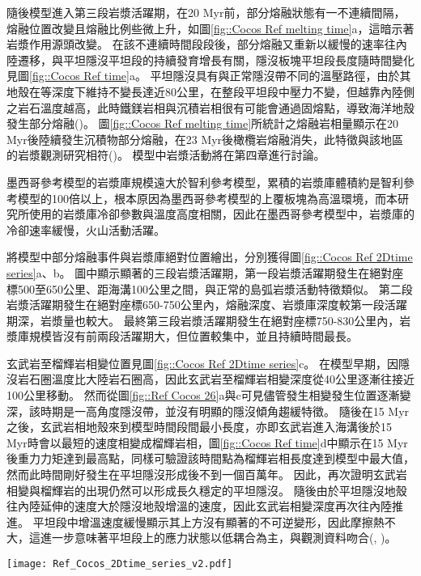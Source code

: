 隨後模型進入第三段岩漿活躍期，在20 Myr前，部分熔融狀態有一不連續間隔，熔融位置改變且熔融比例些微上升，如圖\ref{fig::Cocos Ref melting time}a，這暗示著岩漿作用源頭改變。
在該不連續時間段段後，部分熔融又重新以緩慢的速率往內陸遷移，與平坦隱沒平坦段的持續發育增長有關，隱沒板塊平坦段長度隨時間變化見圖\ref{fig::Cocos Ref time}a。
平坦隱沒具有與正常隱沒帶不同的溫壓路徑，由於其地殼在等深度下維持不變長達近80公里，在整段平坦段中壓力不變，但越靠內陸側之岩石溫度越高，此時鐵鎂岩相與沉積岩相很有可能會通過固熔點，導致海洋地殼發生部分熔融(\citealp{Gutscher2000Bcan})。
圖\ref{fig::Cocos Ref melting time}所統計之熔融岩相量顯示在20 Myr後陸續發生沉積物部分熔融，在23 Myr後橄欖岩熔融消失，此特徵與該地區的岩漿觀測研究相符(\citealp{ferrari2012dynamic})。
模型中岩漿活動將在第四章進行討論。

墨西哥參考模型的岩漿庫規模遠大於智利參考模型，累積的岩漿庫體積約是智利參考模型的100倍以上，根本原因為墨西哥參考模型的上覆板塊為高溫環境，而本研究所使用的岩漿庫冷卻參數與溫度高度相關，因此在墨西哥參考模型中，岩漿庫的冷卻速率緩慢，火山活動活躍。

將模型中部分熔融事件與岩漿庫絕對位置繪出，分別獲得圖\ref{fig::Cocos Ref 2Dtime series}a、b。
圖中顯示顯著的三段岩漿活躍期，第一段岩漿活躍期發生在絕對座標500至650公里、距海溝100公里之間，與正常的島弧岩漿活動特徵類似。
第二段岩漿活躍期發生在絕對座標650-750公里內，熔融深度、岩漿庫深度較第一段活躍期深，岩漿量也較大。
最終第三段岩漿活躍期發生在絕對座標750-830公里內，岩漿庫規模皆沒有前兩段活躍期大，但位置較集中，並且持續時間最長。

玄武岩至榴輝岩相變位置見圖\ref{fig::Cocos Ref 2Dtime series}c。
在模型早期，因隱沒岩石圈溫度比大陸岩石圈高，因此玄武岩至榴輝岩相變深度從40公里逐漸往接近100公里移動。
然而從圖\ref{fig::Ref Cocos 26}a與c可見儘管發生相變發生位置逐漸變深，該時期是一高角度隱沒帶，並沒有明顯的隱沒傾角趨緩特徵。
隨後在15 Myr之後，玄武岩相地殼來到模型時間段間最小長度，亦即玄武岩進入海溝後於15 Myr時會以最短的速度相變成榴輝岩相，圖\ref{fig::Cocos Ref time}d中顯示在15 Myr後重力力矩達到最高點，同樣可驗證該時間點為榴輝岩相長度達到模型中最大值，然而此時間剛好發生在平坦隱沒形成後不到一個百萬年。
因此，再次證明玄武岩相變與榴輝岩的出現仍然可以形成長久穩定的平坦隱沒。
隨後由於平坦隱沒地殼往內陸延伸的速度大於隱沒地殼增溫的速度，因此玄武岩相變深度再次往內陸推進。
平坦段中增溫速度緩慢顯示其上方沒有顯著的不可逆變形，因此摩擦熱不大，這進一步意味著平坦段上的應力狀態以低耦合為主，與觀測資料吻合(\citealp{moran2007cenozoic}, \citealp{PerezCampos2008})。

\begin{figure*}[ht]
    \centering
    \texttt{[image: Ref\_Cocos\_2Dtime\_series\_v2.pdf]}
    \caption[墨西哥參考模型部分熔融、岩漿庫與玄武岩相變時空關係圖]{墨西哥參考模型部分熔融、岩漿庫與玄武岩相變位置時空關係圖。(a)圓點為墨西哥參考模型不同時間的部分熔融發生位置，線條為每10 Myr的隱沒板塊頂部介面(分別為10 Myr, 20Myr, 30 Myr與40 Myr)，橫軸上方標示出模型於40 Myr的相對海溝距離。(b)圓點為墨西哥參考模型不同時間的岩漿庫發生位置，線條為每10 Myr的隱沒板塊頂部介面(分別為10 Myr, 20Myr, 30 Myr與40 Myr)，橫軸上方標示出模型於40 Myr的相對海溝距離。(c)圓點為墨西哥參考模型不同時間之玄武岩相變位置。}
    \label{fig::Cocos Ref 2Dtime series}
\end{figure*}

